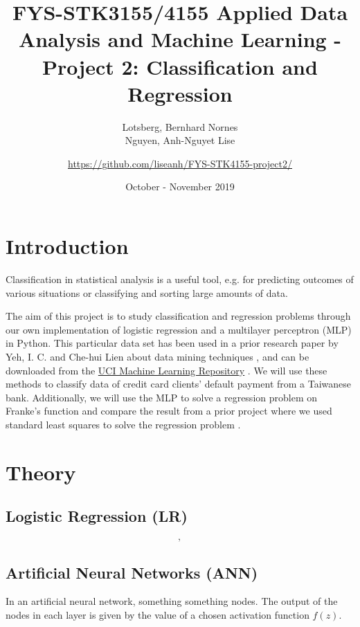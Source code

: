 \documentclass[a4paper, 11pt, twocolumn]{article}
\title{FYS-STK3155/4155 Applied Data Analysis and Machine Learning - Project 2: Classification and Regression }
\author{Lotsberg, Bernhard Nornes \\ Nguyen, Anh-Nguyet Lise \and \url{https://github.com/liseanh/FYS-STK4155-project2/}}
\date{October - November 2019}
\begin{document}

\section{Introduction}
Classification in statistical analysis is a useful tool, e.g. for predicting outcomes of various situations or classifying and sorting large amounts of data. 

The aim of this project is  to study classification and regression problems through our own implementation of logistic regression and a multilayer perceptron (MLP) in Python. This particular data set has been used in a prior research paper by Yeh, I. C. and Che-hui Lien about data mining techniques \cite{origarticle}, and can be downloaded from the \href{https://archive.ics.uci.edu/ml/datasets/default+of+credit+card+clients}{UCI Machine Learning Repository} \cite{UCI}.
We will use these methods to classify data of credit card clients' default payment from a Taiwanese bank. Additionally, we will use the MLP to solve a regression problem on Franke's function and compare the result from a prior project where we used standard least squares to solve the regression problem \cite{regpaper}.  


\section{Theory}

\subsection{Logistic Regression (LR)}
\begin{equation}
,
\end{equation}

\subsection{Artificial Neural Networks (ANN)}
In an artificial neural network, something something nodes. The output of the nodes in each layer is given by the value of a chosen activation function $f(z)$. 	
\end{document}
